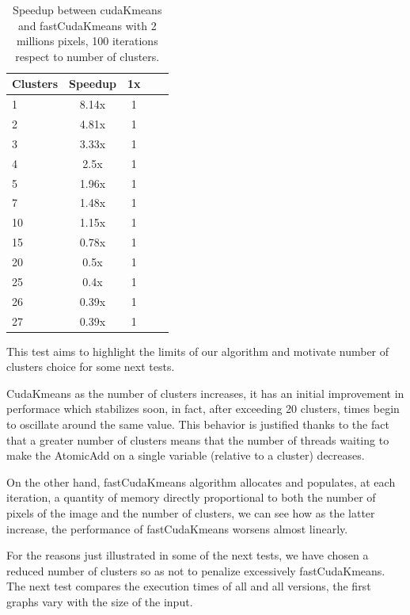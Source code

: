 \documentclass[10pt,twocolumn,letterpaper]{article}
\begin{document}
\begin{table}[H]
\begin{center}
\begin{tabular}{|l|c|c|c|c|}
\hline
Clusters & Speedup & 1x \\
\hline\hline
1 & 8.14x & 1 \\
2 & 4.81x & 1 \\
3 & 3.33x & 1 \\
4 & 2.5x & 1 \\
5 & 1.96x & 1 \\
7 & 1.48x & 1 \\
10 & 1.15x & 1 \\
15 & 0.78x & 1 \\
20 & 0.5x & 1 \\
25 & 0.4x & 1 \\
26 & 0.39x & 1 \\
27 & 0.39x & 1 \\
\hline
\end{tabular}
\end{center}
\caption{Speedup between cudaKmeans and fastCudaKmeans with 2 millions pixels, 100 iterations respect to number of clusters.}
\end{table}

This test aims to highlight the limits of our algorithm and motivate number of clusters choice for some next tests.

CudaKmeans as the number of clusters increases, it has an initial improvement in performace which stabilizes soon, in fact, after exceeding 20 clusters, times begin to oscillate around the same value. This behavior is justified thanks to the fact that a greater number of clusters means that the number of threads waiting to make the AtomicAdd on a single variable (relative to a cluster) decreases.

On the other hand, fastCudaKmeans algorithm allocates and populates, at each iteration, a quantity of memory directly proportional to both the number of pixels of the image and the number of clusters, we can see how as the latter increase, the performance of fastCudaKmeans worsens almost linearly.

For the reasons just illustrated in some of the next tests, we have chosen a reduced number of clusters so as not to penalize excessively fastCudaKmeans.
\\
The next test compares the execution times of all and all versions, the first graphs vary with the size of the input.
\end{document}
